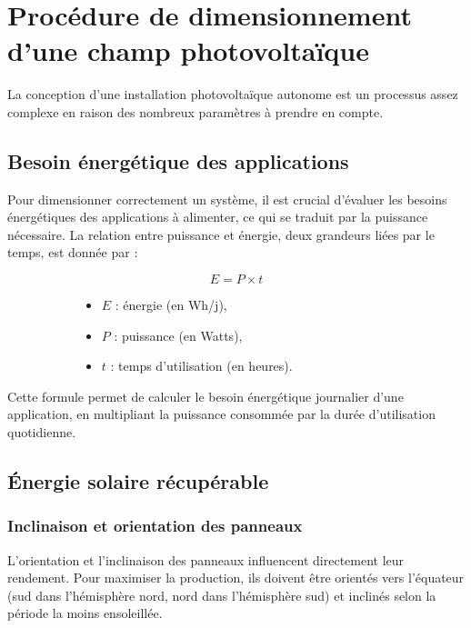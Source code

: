 \section{Procédure de dimensionnement d’une champ photovoltaïque }
La conception d'une installation photovoltaïque autonome est un processus assez complexe en raison des nombreux paramètres à prendre en compte.

\subsection{Besoin énergétique des applications}

Pour dimensionner correctement un système, il est crucial d'évaluer les besoins énergétiques des applications à alimenter, ce qui se traduit par la puissance nécessaire. La relation entre puissance et énergie, deux grandeurs liées par le temps, est donnée par :
\begin{figure}[H]
	\centering
	\begin{subfigure}{0.40\textwidth} %
		\centering
		\begin{equation}
		E = P \times t
		\end{equation}
	\end{subfigure}
	\hfill
	\begin{subfigure}{0.55\textwidth} %
		\centering
		\begin{itemize}
			\item \( E \) : énergie (en Wh/j),
			\item \( P \) : puissance (en Watts),
			\item \( t \) : temps d’utilisation (en heures).
		\end{itemize}
	\end{subfigure}
\end{figure}


Cette formule permet de calculer le besoin énergétique journalier d'une application, en multipliant la puissance consommée par la durée d’utilisation quotidienne.

\subsection{Énergie solaire récupérable}

\subsubsection{Inclinaison et orientation des panneaux}  
L'orientation et l'inclinaison des panneaux influencent directement leur rendement. Pour maximiser la production, ils doivent être orientés vers l'équateur (sud dans l'hémisphère nord, nord dans l'hémisphère sud) et inclinés selon la période la moins ensoleillée.  

